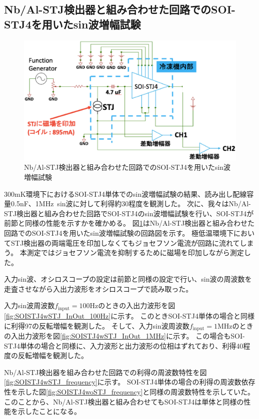 		\subsection{Nb/Al-STJ検出器と組み合わせた回路でのSOI-STJ4を用いたsin波増幅試験}
			\begin{figure}[htbp]
				\begin{center}
					\includegraphics[width=12.0cm]{./Chapter/Chapter4/Picture/SOISTJ4wSTJ_amp_sin.eps}
					\caption{Nb/Al-STJ検出器と組み合わせた回路でのSOI-STJ4を用いたsin波増幅試験\ }
					\label{fig:SOISTJ4wSTJ_amp_sin}
				\end{center}
			\end{figure}
			300mK環境下におけるSOI-STJ4単体でのsin波増幅試験の結果、読み出し配線容量0.5nF、1MHz\ sin波に対して利得約30程度を観測した。
			次に、我々はNb/Al-STJ検出器と組み合わせた回路でSOI-STJ4のsin波増幅試験を行い、SOI-STJ4が前節と同様の性能を示すかを確かめる。
			図\ref{fig:SOISTJ4wSTJ_amp_sin}はNb/Al-STJ検出器と組み合わせた回路でのSOI-STJ4を用いたsin波増幅試験の回路図を示す。
			極低温環境下においてSTJ検出器の両端電圧を印加しなくてもジョセフソン電流が回路に流れてしまう。
			本測定ではジョセフソン電流を抑制するために磁場を印加しながら測定した。
			
			入力sin波、オシロスコープの設定は前節と同様の設定で行い、sin波の周波数を走査させながら入出力波形をオシロスコープで読み取った。
			
			入力sin波周波数$f_{\mathrm{input}}=100\mathrm{Hz}$のときの入出力波形を図\ref{fig:SOISTJ4wSTJ_InOut_100Hz}に示す。
			このときSOI-STJ4単体の場合と同様に利得97の反転増幅を観測した。
			そして、入力sin波周波数$f_{\mathrm{input}}=1\mathrm{MHz}$のときの入出力波形を図\ref{fig:SOISTJ4wSTJ_InOut_1MHz}に示す。
			この場合もSOI-STJ4単体の場合と同様に、入力波形と出力波形の位相はずれており、利得40程度の反転増幅を観測した。
			
			Nb/Al-STJ検出器を組み合わせた回路での利得の周波数特性を図\ref{fig:SOISTJ4wSTJ_frequency}に示す。
			SOI-STJ4単体の場合の利得の周波数依存性を示した図\ref{fig:SOISTJ4woSTJ_frequency}と同様の周波数特性を示していた。
			このことから、Nb/Al-STJ検出器と組み合わせてもSOI-STJ4は単体と同様の性能を示したことになる。
			
